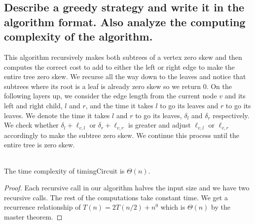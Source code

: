 \documentclass[11pt]{scrartcl}
\begin{document}
	\subsection{
		Describe a greedy strategy and write it in the algorithm format. Also
		analyze the computing complexity of the algorithm.
	}
	This algorithm recursively makes both subtrees of a vertex zero skew and then
	computes the correct cost to add to either the left or right edge to make the
	entire tree zero skew. We recurse all the way down to the leaves and notice that
	subtrees where its root is a leaf is already zero skew so we return $0$.
	On the following layers up, we consider the edge length from the current node $v$ and
	its left and right child, $l$ and $r$, and the time it takes $l$ to go its leaves and
	$r$ to go its leaves. We denote the time it takes $l$ and $r$ to go its leaves, $\delta_l$
	and $\delta_r$ respectively. We check whether $\delta_l + \ell_{v,l}$ or $\delta_r + \ell_{v,r}$
	is greater and adjust $\ell_{v,l}$ or $\ell_{v,r}$ accordingly to make the subtree zero skew.
	We continue this process until the entire tree is zero skew.
	\begin{algorithm}
	\end{algorithm}\-\\
	The time complexity of timingCircuit is $\Theta(n)$.
	\begin{proof}
		Each recursive call in our algorithm halves the input size and we have two
		recursive calls. The rest of the computations take constant time.
		We get a recurrence relationship of $T(n) = 2T(n/2) + n^0$
		which is $\Theta(n)$ by the master theorem.
	\end{proof}
\end{document}
